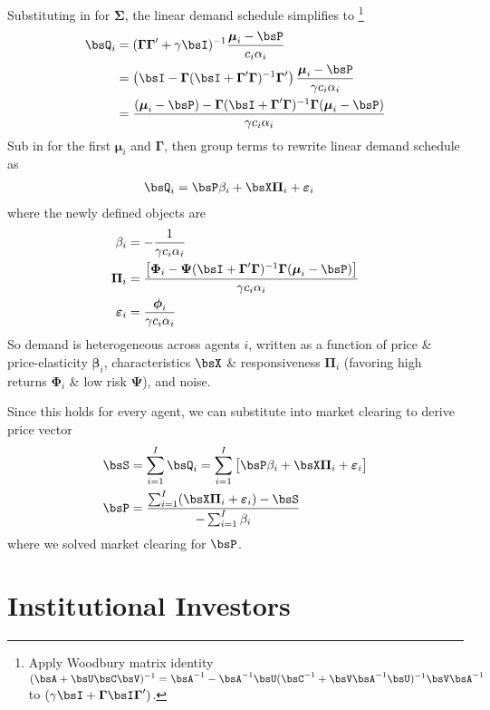 \documentclass[12pt]{article}
\theoremstyle{plain}
\theoremstyle{definition}
\theoremstyle{remark}
\newcommand{\bsmu}{\boldsymbol{\mu}}
\newcommand{\bsSigma}{\boldsymbol{\Sigma}}
\newcommand{\bsvarepsilon}{\boldsymbol{\varepsilon}}
\newcommand{\bsbeta}{\boldsymbol{\beta}}
\newcommand{\bsPi}{\boldsymbol{\Pi}}
\newcommand{\bsGamma}{\boldsymbol{\Gamma}}
\newcommand{\bsPsi}{\boldsymbol{\Psi}}
\newcommand{\bsPhi}{\boldsymbol{\Phi}}
\newcommand{\bsphi}{\boldsymbol{\phi}}
\begin{document}
\begin{multicols*}{2}
Substituting in for $\bsSigma$, the linear demand schedule simplifies to
\footnote{%
  Apply Woodbury matrix identity
  $(\bsA +
  \bsU\bsC\bsV)^{-1}=\bsA^{-1}-\bsA^{-1}\bsU(\bsC^{-1}+\bsV\bsA^{-1}\bsU)^{-1}\bsV\bsA^{-1}$
  to $(\gamma\bsI+\bsGamma\bsI\bsGamma')$.
}
\begin{align*}
  \bsQ_i
  &=
  (\bsGamma\bsGamma'+\gamma\bsI)^{-1}\frac{\bsmu_i-\bsP}{c_i\alpha_i}
  \\
  &=
  \left(\bsI-\bsGamma(\bsI+\bsGamma'\bsGamma)^{-1}\bsGamma'\right)
  \frac{\bsmu_i-\bsP}{\gamma c_i\alpha_i}
  \\
  &=
  \frac{(\bsmu_i-\bsP)-\bsGamma(\bsI+\bsGamma'\bsGamma)^{-1}\bsGamma(\bsmu_i-\bsP)}{\gamma c_i\alpha_i}
\end{align*}
Sub in for the first $\bsmu_i$ and $\bsGamma$, then group terms to
rewrite linear demand schedule as
\begin{align*}
  \bsQ_i
  &=
  \bsP\beta_i
  +
  \bsX\bsPi_i
  +
  \bsvarepsilon_i
\end{align*}
where the newly defined objects are
\begin{align*}
  \beta_i &=
  -\frac{1}{\gamma c_i\alpha_i}
  \\
  \bsPi_i
  &=
  \frac{\big[\bsPhi_i-\bsPsi(\bsI+\bsGamma'\bsGamma)^{-1}\bsGamma(\bsmu_i-\bsP)\big]}{\gamma c_i\alpha_i}
  \\
  \bsvarepsilon_i
  &=
  \frac{\bsphi_i}{\gamma c_i\alpha_i}
\end{align*}
So demand is heterogeneous across agents $i$, written as a function of
price \& price-elasticity $\bsbeta_i$, characteristics $\bsX$ \&
responsiveness $\bsPi_i$ (favoring high returns $\bsPhi_i$ \& low risk
$\bsPsi$), and noise.

Since this holds for every agent, we can substitute into market clearing
to derive price vector
\begin{align*}
  \bsS &= \sum_{i=1}^I
  \bsQ_i
  =
  \sum_{i=1}^I
  \big[
  \bsP\beta_i
  +
  \bsX\bsPi_i
  +
  \bsvarepsilon_i
  \big]
  \\
  \bsP
  &=
  \frac{
  \sum_{i=1}^I
  (
  \bsX\bsPi_i
  +
  \bsvarepsilon_i
  )
  -
  \bsS
  }{%
  -
  \sum_{i=1}^I\beta_i
  }
\end{align*}
where we solved market clearing for $\bsP$.


\clearpage
\section{Institutional Investors}




\end{multicols*}
\end{document}
